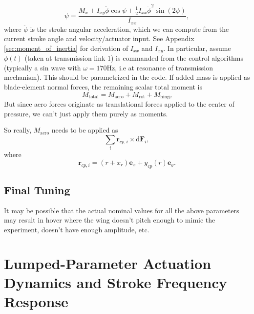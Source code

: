 \documentclass{article}
\newcommand{\D}{\mathrm{d}}
\begin{document}
\begin{equation}
    \ddot{\psi}
    =
    \frac{
        M_x
        + I_{xy}\ddot{\phi}\cos\psi
        + \frac{1}{2} I_{xx}\dot{\phi}^{2}\sin(2\psi)
    }{
        I_{xx}
    }, 
\end{equation}
where \(\ddot{\phi}\) is the stroke angular acceleration, which we can compute from the current stroke angle and velocity/actuator input. See Appendix \ref{sec:moment_of_inertia} for derivation of \(I_{xx}\) and \(I_{xy}\). In particular, assume \(\phi(t)\) (taken at transmission link 1) is commanded from the control algorithms (typically a sin wave with \(\omega = 170 \mathrm{Hz}\), i.e at resonance of transmission mechanism). This should be parametrized in the code. If added mass is applied as blade-element normal forces, the remaining scalar total moment is
\begin{equation}
    M_{\mathrm{total}}
    =
    M_{\mathrm{aero}}
    + M_{\mathrm{rot}}
    + M_{\mathrm{hinge}}
\end{equation}
But since aero forces originate as translational forces applied to the center of pressure, we can't just apply them purely as moments. 

So really, \(M_{\mathrm{aero}}\) needs to be applied as 
\begin{equation}
    \sum_i \mathbf{r}_{cp,i} \times \D \mathbf{F}_i, 
\end{equation}
where 
\begin{equation}
    \mathbf{r}_{cp,i} = (r+x_r)\mathbf{e}_x + y_{cp}(r)\mathbf{e}_y.
\end{equation}

\subsection{Final Tuning} 
It may be possible that the actual nominal values for all the above parameters may result in hover where the wing doesn't pitch enough to mimic the experiment, doesn't have enough amplitude, etc. 
\section{Lumped-Parameter Actuation Dynamics and Stroke Frequency Response}
\label{sec:lumped_actuation}
\end{document}
